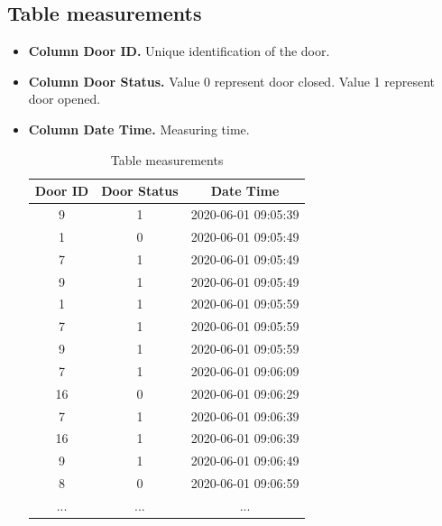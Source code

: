 \subsection*{Table measurements}
\begin{itemize}
    \item \textbf{Column Door ID.} Unique identification of the door.
    \item \textbf{Column Door Status.} Value 0 represent door closed. Value 1 represent door opened.
    \item \textbf{Column Date Time.} Measuring time.
    \begin{table}[htb]
    \centering
    \begin{tabular}{|c| c| c|} 
    \hline
    Door ID & Door Status & Date Time \\
    \hline
    9 & 1 & 2020-06-01 09:05:39 \\ \hline
    1 & 0 & 2020-06-01 09:05:49 \\ \hline
    7 & 1 & 2020-06-01 09:05:49 \\ \hline
    9 & 1 & 2020-06-01 09:05:49 \\ \hline
    1 & 1 & 2020-06-01 09:05:59 \\ \hline
    7 & 1 & 2020-06-01 09:05:59 \\ \hline
    9 & 1 & 2020-06-01 09:05:59 \\ \hline
    7 & 1 & 2020-06-01 09:06:09 \\ \hline
    16 & 0 & 2020-06-01 09:06:29 \\ \hline
    7 & 1 & 2020-06-01 09:06:39 \\ \hline
    16 & 1 & 2020-06-01 09:06:39 \\ \hline
    9 & 1 & 2020-06-01 09:06:49 \\ \hline
    8 & 0 & 2020-06-01 09:06:59 \\ \hline
    ... & ...& ... \\ \hline
    \end{tabular}
    \caption{Table measurements}
    \label{tab:db_measurement_result}
    \end{table}
\end{itemize}


